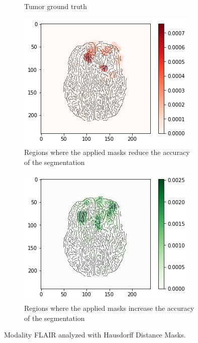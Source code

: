 \begin{figure}[H]
\begin{subfigure}[t]{.4\textwidth}
        \caption{Tumor ground truth}
    \end{subfigure}
    \begin{subfigure}[t]{.45\textwidth}
        \centering
        \includegraphics[width=\linewidth]{chapters/06_hdm/c_Brats18_2013_17_1_L1/58.png}
        \caption{Regions where the applied masks reduce the accuracy of the segmentation}
    \end{subfigure}\hspace{1cm}%
    \begin{subfigure}[t]{.45\textwidth}
        \centering
        \includegraphics[width=\linewidth]{chapters/06_hdm/c_Brats18_2013_17_1_L1/59.png}
        \caption{Regions where the applied masks increase the accuracy of the segmentation}
    \end{subfigure}
    \caption{Modality FLAIR analyzed with Hausdorff Distance Masks.}
    \label{brats_201317_flair}
\end{figure}

